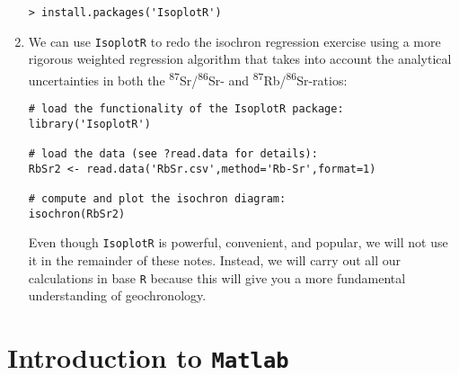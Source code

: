 \documentclass{book}
\begin{document}
\begin{enumerate}
\begin{verbatim}
> install.packages('IsoplotR')
\end{verbatim}

\item We can use \texttt{IsoplotR} to redo the isochron regression
  exercise using a more rigorous weighted regression algorithm that
  takes into account the analytical uncertainties in both the
  \textsuperscript{87}Sr/\textsuperscript{86}Sr- and
  \textsuperscript{87}Rb/\textsuperscript{86}Sr-ratios:

\begin{verbatim}
# load the functionality of the IsoplotR package:
library('IsoplotR')

# load the data (see ?read.data for details):
RbSr2 <- read.data('RbSr.csv',method='Rb-Sr',format=1)

# compute and plot the isochron diagram:
isochron(RbSr2)
\end{verbatim}

Even though \texttt{IsoplotR} is powerful, convenient, and popular, we
will not use it in the remainder of these notes. Instead, we will
carry out all our calculations in base \texttt{R} because this will
give you a more fundamental understanding of geochronology.
\end{enumerate}

\section{Introduction to \texttt{Matlab}}
\label{sec:Matlab}
\end{document}
